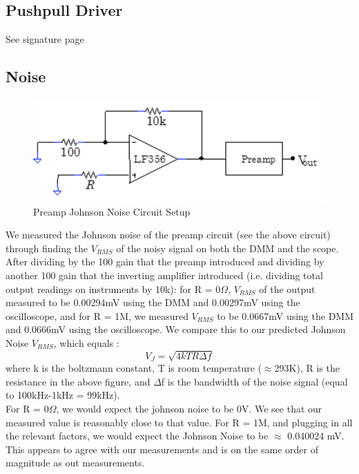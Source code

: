 \documentclass{article}
\begin{document}
\subsection{Pushpull Driver}
    See signature page
    
\subsection{Noise}
    \begin{figure}[H]
        \centering
        \includegraphics[scale = 0.5]{12.png}
        \caption{Preamp Johnson Noise Circuit Setup \cite{lab8}}
        \label{fig:my_label}
    \end{figure}
    We measured the Johnson noise of the preamp circuit (see the above circuit) through finding the $V_{RMS}$ of the noisy signal on both the DMM and the scope. After dividing by the 100 gain that the preamp introduced and dividing by another 100 gain that the inverting amplifier introduced (i.e. dividing total output readings on instruments by 10k): for R = 0$\Omega$, $V_{RMS}$ of the output measured to be 0.00294mV using the DMM and 0.00297mV using the oscilloscope, and for R = 1M, we measured $V_{RMS}$ to be 0.0667mV using the DMM and 0.0666mV using the oscilloscope. We compare this to our predicted Johnson Noise $V_{RMS}$, which equals \cite{Johnson}:
    \begin{equation}
        V_J = \sqrt{4kTR\Delta f}
    \end{equation}
    where k is the boltzmann constant, T is room temperature ($\approx$293K), R is the resistance in the above figure, and $\Delta$f is the bandwidth of the noise signal (equal to 100kHz-1kHz = 99kHz).\\\indent For R = 0$\Omega$, we would expect the johnson noise to be 0V. We see that our measured value is  reasonably close to that value. For R = 1M, and plugging in all the relevant factors, we would expect the Johnson Noise to be $\approx$ 0.040024 mV. This appears to agree with our measurements and is on the same order of magnitude as out measurements.
\end{document}
